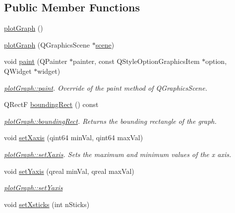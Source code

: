 \subsection*{Public Member Functions}
\begin{DoxyCompactItemize}
\item 
\hyperlink{classplot_graph_a53902ce2d9f08bfda697a887061b12ca}{plot\-Graph} ()
\item 
\hyperlink{classplot_graph_ab906e233fa8fb7af50314e62305d8ca6}{plot\-Graph} (Q\-Graphics\-Scene $\ast$\hyperlink{classplot_graph_ac35eabe1a0ffbb4379fedebe6d5057c3}{scene})
\item 
void \hyperlink{classplot_graph_aa72b60c4f95834599921874fab85d01b}{paint} (Q\-Painter $\ast$painter, const Q\-Style\-Option\-Graphics\-Item $\ast$option, Q\-Widget $\ast$widget)
\begin{DoxyCompactList}\small\item\em \hyperlink{classplot_graph_aa72b60c4f95834599921874fab85d01b}{plot\-Graph\-::paint}. Override of the paint method of Q\-Graphics\-Scene. \end{DoxyCompactList}\item 
Q\-Rect\-F \hyperlink{classplot_graph_a65061b6dda44811830977d80f46ed15e}{bounding\-Rect} () const 
\begin{DoxyCompactList}\small\item\em \hyperlink{classplot_graph_a65061b6dda44811830977d80f46ed15e}{plot\-Graph\-::bounding\-Rect}. Returns the bounding rectangle of the graph. \end{DoxyCompactList}\item 
void \hyperlink{classplot_graph_a860f6e766de63d3a7a251f528dcc4be7}{set\-Xaxis} (qint64 min\-Val, qint64 max\-Val)
\begin{DoxyCompactList}\small\item\em \hyperlink{classplot_graph_a860f6e766de63d3a7a251f528dcc4be7}{plot\-Graph\-::set\-Xaxis}. Sets the maximum and minimum values of the x axis. \end{DoxyCompactList}\item 
void \hyperlink{classplot_graph_a0e2e3589bfc5cc726e367bf8bdc8a2f5}{set\-Yaxis} (qreal min\-Val, qreal max\-Val)
\begin{DoxyCompactList}\small\item\em \hyperlink{classplot_graph_a0e2e3589bfc5cc726e367bf8bdc8a2f5}{plot\-Graph\-::set\-Yaxis} \end{DoxyCompactList}\item 
void \hyperlink{classplot_graph_ab78b439ee76e1f4df9a9e26ebcd3bc29}{set\-Xsticks} (int n\-Sticks)

\end{DoxyCompactItemize}
